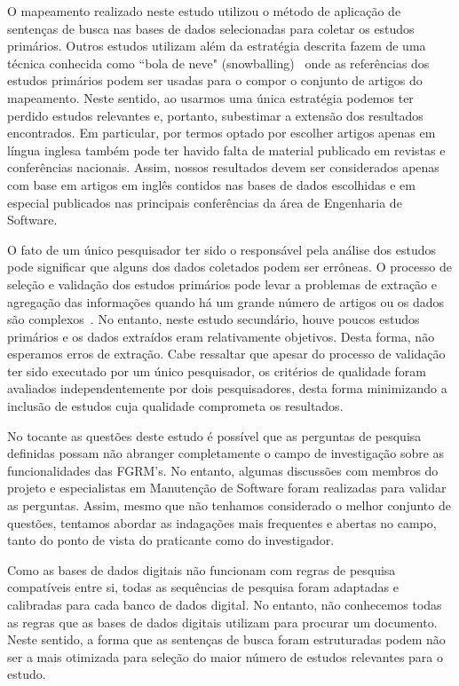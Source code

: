 O mapeamento realizado neste estudo utilizou o método de aplicação de sentenças
de busca nas bases de dados selecionadas para coletar os estudos primários.
Outros estudos utilizam além da estratégia descrita fazem de uma técnica
conhecida  como ``bola de neve" (snowballing)~\cite{wohlin2014guidelines} onde
as referências dos estudos primários podem ser usadas para o compor o conjunto
de artigos do mapeamento. Neste sentido, ao usarmos uma única estratégia podemos
ter perdido estudos relevantes e, portanto, subestimar a extensão dos resultados
encontrados. Em particular, por termos optado por escolher artigos apenas em
língua inglesa também pode ter havido falta de material publicado em revistas e
conferências nacionais. Assim, nossos resultados devem ser considerados apenas
com base em artigos em inglês contidos nas bases de dados escolhidas  e em
especial publicados nas principais conferências da área de Engenharia de
Software.

O fato de um único pesquisador ter sido o responsável pela análise dos estudos
pode significar que alguns dos dados coletados podem ser errôneas. O processo de
seleção e validação dos estudos primários pode levar a problemas de extração e
agregação das informações quando há um grande número de artigos ou os dados são
complexos~\cite{keele2007guidelines}. No entanto, neste estudo secundário, houve
poucos estudos primários e os dados extraídos eram relativamente objetivos.
Desta forma, não esperamos erros de extração. Cabe ressaltar que apesar do
processo de validação ter sido executado por um único pesquisador, os critérios
de qualidade foram avaliados independentemente por dois pesquisadores, desta
forma minimizando a inclusão de estudos cuja qualidade comprometa os resultados.

No tocante as questões deste estudo  é  possível que as perguntas de pesquisa
definidas possam não abranger completamente o campo de investigação sobre as
funcionalidades das FGRM's. No entanto, algumas discussões com membros do
projeto e especialistas em Manutenção de Software foram realizadas para validar
as perguntas. Assim, mesmo que não tenhamos considerado o melhor conjunto de
questões, tentamos abordar as indagações mais frequentes e abertas no campo,
tanto do ponto de vista do praticante como do investigador.

Como as bases de dados digitais não funcionam com regras de pesquisa compatíveis
entre si, todas as sequências de pesquisa foram adaptadas e calibradas para cada
banco de dados digital. No entanto, não conhecemos todas as regras que as bases
de dados digitais utilizam para procurar um documento. Neste sentido, a forma
que as sentenças de busca foram estruturadas podem não ser a mais otimizada para
seleção do maior número de estudos relevantes para o estudo.

